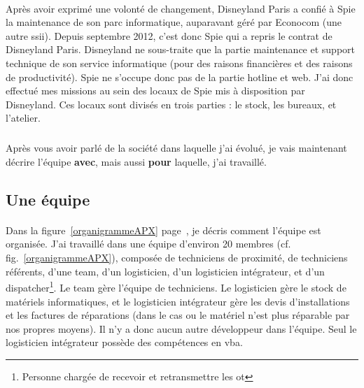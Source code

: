 \paragraph{}
Après avoir exprimé une volonté de changement, Disneyland Paris a confié à Spie la maintenance de son parc informatique, auparavant géré par Econocom (une autre \gls{ssii}).
Depuis septembre 2012, c'est donc Spie qui a repris le contrat de Disneyland Paris.
Disneyland ne sous-traite que la partie maintenance et support technique de son service informatique (pour des raisons financières et des raisons de productivité). Spie ne s'occupe donc pas de la partie \foreignlanguage{english}{hotline} et web.
J'ai donc effectué mes missions au sein des locaux de Spie mis à disposition par Disneyland. Ces locaux sont divisés en trois parties : le stock, les bureaux, et l'atelier.
\subparagraph{}
Après vous avoir parlé de la société dans laquelle j'ai évolué, je vais maintenant décrire l'équipe \textbf{avec}, mais aussi \textbf{pour} laquelle, j'ai travaillé.




\subsection{Une équipe}
\paragraph{}

Dans la figure~\ref{organigrammeAPX} page~\pageref{organigrammeAPX}, je décris comment l'équipe est organisée.
J'ai travaillé dans une équipe d'environ 20 membres (cf. fig.~\ref{organigrammeAPX}), composée de techniciens de proximité, de techniciens référents, d'une \foreignlanguage{english}{\gls{team}}, d'un logisticien, d'un logisticien intégrateur, et d'un \foreignlanguage{english}{\gls{dispatcher}\footnote{Personne chargée de recevoir et retransmettre les \gls{ot}}}. Le \foreignlanguage{english}{\gls{team}} gère l'équipe de techniciens. Le logisticien gère le stock de matériels informatiques, et le logisticien intégrateur gère les devis d'installations et les factures de réparations (dans le cas ou le matériel n'est plus réparable par nos propres moyens). Il n'y a donc aucun autre développeur dans l'équipe. Seul le logisticien intégrateur possède des compétences en \gls{vba}.

